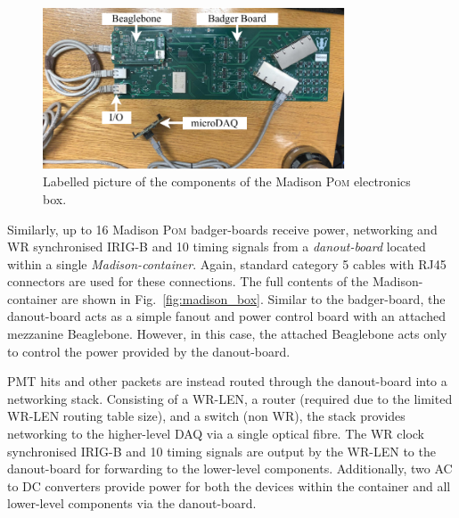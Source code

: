 \begin{figure} %
    \includegraphics[width=0.8\textwidth]{diagrams/5-daq/madison_plane.pdf}
    \caption[Labelled picture of the components of the Madison \textsc{Pom} electronics box]
    {Labelled picture of the components of the Madison \textsc{Pom} electronics box.}
    \label{fig:madison_plane}
\end{figure}

Similarly, up to 16 Madison \textsc{Pom} badger-boards receive power, networking and WR
synchronised IRIG-B and \unit{10}{} timing signals from a \emph{danout-board} located
within a single \emph{Madison-container}. Again, standard category 5 cables with RJ45 connectors
are used for these connections. The full contents of the Madison-container are shown in
Fig.~\ref{fig:madison_box}. Similar to the badger-board, the danout-board acts as a simple fanout
and power control board with an attached mezzanine Beaglebone. However, in this case, the attached
Beaglebone acts only to control the power provided by the danout-board.

PMT hits and other packets are instead routed through the danout-board into a networking stack.
Consisting of a WR-LEN, a router (required due to the limited WR-LEN routing table size), and a
switch (non WR), the stack provides networking to the higher-level DAQ via a single optical fibre.
The WR clock synchronised IRIG-B and \unit{10}{} timing signals are output by the WR-LEN
to the danout-board for forwarding to the lower-level components. Additionally, two AC to DC
converters provide power for both the devices within the container and all lower-level components
via the danout-board.


